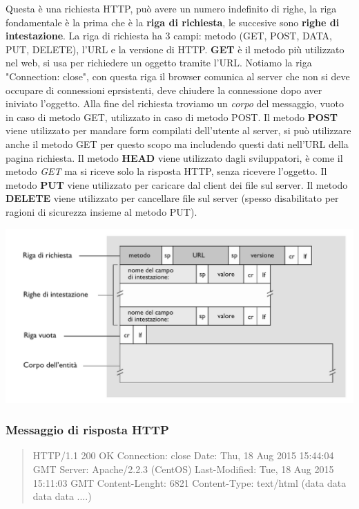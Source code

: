 Questa è una richiesta HTTP, può avere un numero indefinito di righe, la riga fondamentale è la prima che è la \textbf{riga di richiesta}, le succesive sono \textbf{righe di intestazione}.
La riga di richiesta ha 3 campi: metodo (GET, POST, DATA, PUT, DELETE), l'URL e la versione di HTTP. \newline
\textbf{GET} è il metodo più utilizzato nel web, si usa per richiedere un oggetto tramite l'URL.
Notiamo la riga "Connection: close", con questa riga il browser comunica al server che non si deve occupare di connessioni eprsistenti, deve chiudere la connessione dopo aver iniviato l'oggetto.\newline
Alla fine del richiesta troviamo un \textit{corpo} del messaggio, vuoto in caso di metodo GET, utilizzato in caso di metodo POST. \newline
Il metodo \textbf{POST} viene utilizzato per mandare form compilati dell'utente al server, si può utilizzare anche il metodo GET per questo scopo ma includendo questi dati nell'URL della pagina richiesta. \newline
Il metodo \textbf{HEAD} viene utilizzato dagli sviluppatori, è come il metodo \textit{GET} ma si riceve solo la risposta HTTP, senza ricevere l'oggetto. \newline
Il metodo \textbf{PUT} viene utilizzato per caricare dal client dei file sul server. \newline
Il metodo \textbf{DELETE} viene utilizzato per cancellare file sul server (spesso disabilitato per ragioni di sicurezza insieme al metodo PUT). \newline

\includegraphics[width=\textwidth]{./img/richiestaHTTP.png}

\subsubsection*{Messaggio di risposta HTTP}
\begin{quote}
  HTTP/1.1 200 OK
  Connection: close \newline
  Date: Thu, 18 Aug 2015 15:44:04 GMT \newline
  Server: Apache/2.2.3 (CentOS) \newline
  Last-Modified: Tue, 18 Aug 2015 15:11:03 GMT \newline
  Content-Lenght: 6821 \newline
  Content-Type: text/html \newline
  (data data data data ....)
\end{quote}

